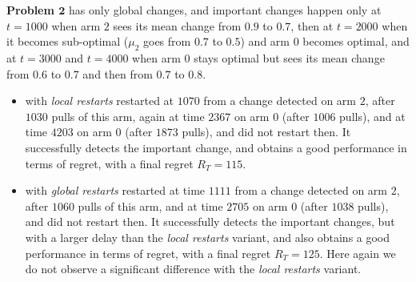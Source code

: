

\textbf{Problem $\bm{2}$} has only global changes, and important changes happen only at $t=1000$ when arm $2$ sees its mean change from $0.9$ to $0.7$, then at $t=2000$ when it becomes sub-optimal ($\mu_2$ goes from $0.7$ to $0.5$) and arm $0$ becomes optimal, and at $t=3000$ and $t=4000$ when arm $0$ stays optimal but sees its mean change from $0.6$ to $0.7$ and then from $0.7$ to $0.8$.

\begin{itemize}
    \item
    \GLRklUCB{} with \emph{local restarts} restarted at $1070$ from a change detected on arm $2$, after $1030$ pulls of this arm, again at time $2367$ on arm $0$ (after $1006$ pulls), and at time $4203$ on arm $0$ (after $1873$ pulls), and did not restart then.
    It successfully detects the important change, and obtains a good performance in terms of regret, with a final regret $R_T = 115$.

    \item
    \GLRklUCB{} with \emph{global restarts} restarted at time $1111$ from a change detected on arm $2$, after $1060$ pulls of this arm, and at time $2705$ on arm $0$ (after $1038$ pulls), and did not restart then.
    It successfully detects the important changes, but with a larger delay than the \emph{local restarts} variant, and also obtains a good performance in terms of regret, with a final regret $R_T = 125$.
    Here again we do not observe a significant difference with the \emph{local restarts} variant.


\end{itemize}
